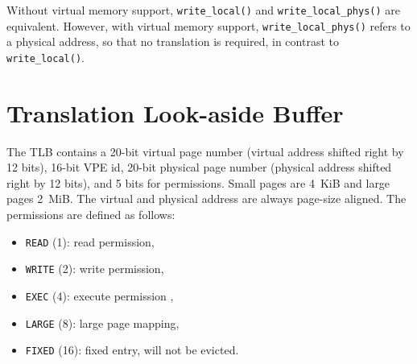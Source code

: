 Without virtual memory support, \texttt{write\_local()} and \texttt{write\_local\_phys()} are
equivalent. However, with virtual memory support, \texttt{write\_local\_phys()} refers to a physical
address, so that no translation is required, in contrast to \texttt{write\_local()}.

\section{Translation Look-aside Buffer}
\label{sec:tlb}

The TLB contains a 20-bit virtual page number (virtual address shifted right by 12 bits), 16-bit VPE
id, 20-bit physical page number (physical address shifted right by 12 bits), and 5 bits for
permissions. Small pages are 4~KiB and large pages 2~MiB. The virtual and physical address are
always page-size aligned. The permissions are defined as follows:

\begin{itemize}
  \item \texttt{READ} (1): read permission,
  \item \texttt{WRITE} (2): write permission,
  \item \texttt{EXEC} (4): execute permission ,
  \item \texttt{LARGE} (8): large page mapping,
  \item \texttt{FIXED} (16): fixed entry, will not be evicted.
\end{itemize}
\extend{}
